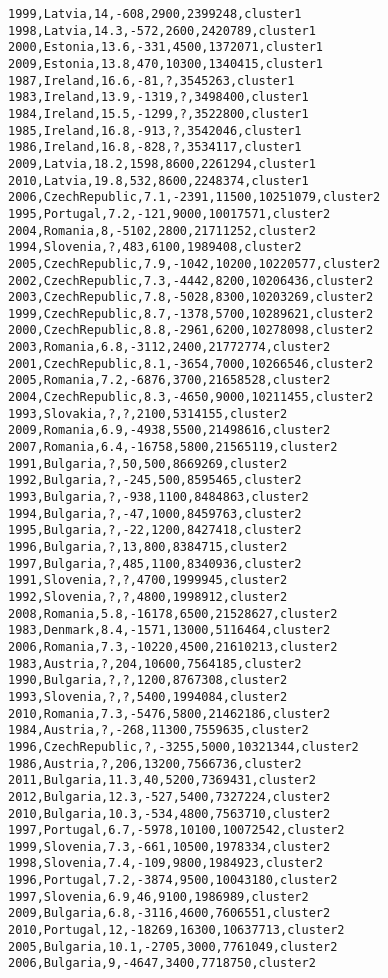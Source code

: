 \begin{lstlisting}[basicstyle=\footnotesize\ttfamily,numbers=none]
1999,Latvia,14,-608,2900,2399248,cluster1
1998,Latvia,14.3,-572,2600,2420789,cluster1
2000,Estonia,13.6,-331,4500,1372071,cluster1
2009,Estonia,13.8,470,10300,1340415,cluster1
1987,Ireland,16.6,-81,?,3545263,cluster1
1983,Ireland,13.9,-1319,?,3498400,cluster1
1984,Ireland,15.5,-1299,?,3522800,cluster1
1985,Ireland,16.8,-913,?,3542046,cluster1
1986,Ireland,16.8,-828,?,3534117,cluster1
2009,Latvia,18.2,1598,8600,2261294,cluster1
2010,Latvia,19.8,532,8600,2248374,cluster1
2006,CzechRepublic,7.1,-2391,11500,10251079,cluster2
1995,Portugal,7.2,-121,9000,10017571,cluster2
2004,Romania,8,-5102,2800,21711252,cluster2
1994,Slovenia,?,483,6100,1989408,cluster2
2005,CzechRepublic,7.9,-1042,10200,10220577,cluster2
2002,CzechRepublic,7.3,-4442,8200,10206436,cluster2
2003,CzechRepublic,7.8,-5028,8300,10203269,cluster2
1999,CzechRepublic,8.7,-1378,5700,10289621,cluster2
2000,CzechRepublic,8.8,-2961,6200,10278098,cluster2
2003,Romania,6.8,-3112,2400,21772774,cluster2
2001,CzechRepublic,8.1,-3654,7000,10266546,cluster2
2005,Romania,7.2,-6876,3700,21658528,cluster2
2004,CzechRepublic,8.3,-4650,9000,10211455,cluster2
1993,Slovakia,?,?,2100,5314155,cluster2
2009,Romania,6.9,-4938,5500,21498616,cluster2
2007,Romania,6.4,-16758,5800,21565119,cluster2
1991,Bulgaria,?,50,500,8669269,cluster2
1992,Bulgaria,?,-245,500,8595465,cluster2
1993,Bulgaria,?,-938,1100,8484863,cluster2
1994,Bulgaria,?,-47,1000,8459763,cluster2
1995,Bulgaria,?,-22,1200,8427418,cluster2
1996,Bulgaria,?,13,800,8384715,cluster2
1997,Bulgaria,?,485,1100,8340936,cluster2
1991,Slovenia,?,?,4700,1999945,cluster2
1992,Slovenia,?,?,4800,1998912,cluster2
2008,Romania,5.8,-16178,6500,21528627,cluster2
1983,Denmark,8.4,-1571,13000,5116464,cluster2
2006,Romania,7.3,-10220,4500,21610213,cluster2
1983,Austria,?,204,10600,7564185,cluster2
1990,Bulgaria,?,?,1200,8767308,cluster2
1993,Slovenia,?,?,5400,1994084,cluster2
2010,Romania,7.3,-5476,5800,21462186,cluster2
1984,Austria,?,-268,11300,7559635,cluster2
1996,CzechRepublic,?,-3255,5000,10321344,cluster2
1986,Austria,?,206,13200,7566736,cluster2
2011,Bulgaria,11.3,40,5200,7369431,cluster2
2012,Bulgaria,12.3,-527,5400,7327224,cluster2
2010,Bulgaria,10.3,-534,4800,7563710,cluster2
1997,Portugal,6.7,-5978,10100,10072542,cluster2
1999,Slovenia,7.3,-661,10500,1978334,cluster2
1998,Slovenia,7.4,-109,9800,1984923,cluster2
1996,Portugal,7.2,-3874,9500,10043180,cluster2
1997,Slovenia,6.9,46,9100,1986989,cluster2
2009,Bulgaria,6.8,-3116,4600,7606551,cluster2
2010,Portugal,12,-18269,16300,10637713,cluster2
2005,Bulgaria,10.1,-2705,3000,7761049,cluster2
2006,Bulgaria,9,-4647,3400,7718750,cluster2

\end{lstlisting}
